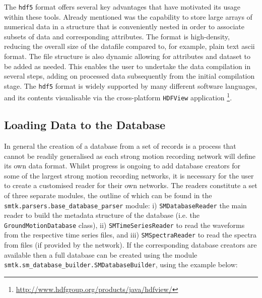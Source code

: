 The \verb=hdf5= format offers several key advantages that have motivated its usage within these tools. Already mentioned was the capability to store large arrays of numerical data in a structure that is conveniently nested in order to associate subsets of data and corresponding attributes. The format is high-density, reducing the overall size of the datafile compared to, for example, plain text ascii format. The file structure is also dynamic allowing for attributes and dataset to be added as needed. This enables the user to undertake the data compilation in several steps, adding on processed data subsequently from the initial compilation stage. The \verb=hdf5= format is widely supported by many different software languages, and its contents visualisable via the cross-platform \verb=HDFView= application \footnote{\href{http://www.hdfgroup.org/products/java/hdfview/}{http://www.hdfgroup.org/products/java/hdfview/}}. 

\subsection{Loading Data to the Database}

In general the creation of a database from a set of records is a process that cannot be readily generalised as each strong motion recording network will define its own data format. Whilst progress is ongoing to add database creators for some of the largest strong motion recording networks, it is necessary for the user to create a customised reader for their own networks. The readers constitute a set of three separate modules, the outline of which can be found in the \verb=smtk.parsers.base_database_parser= module: i) \verb=SMDatabaseReader= the main reader to build the metadata structure of the database (i.e. the \verb=GroundMotionDatabase= class), ii) \verb=SMTimeSeriesReader= to read the waveforms from the respective time series files, and iii) \verb=SMSpectraReader= to read the spectra from files (if provided by the network). If the corresponding database creators are available then a full database can be created using the module \verb=smtk.sm_database_builder.SMDatabaseBuilder=, using the example below:

